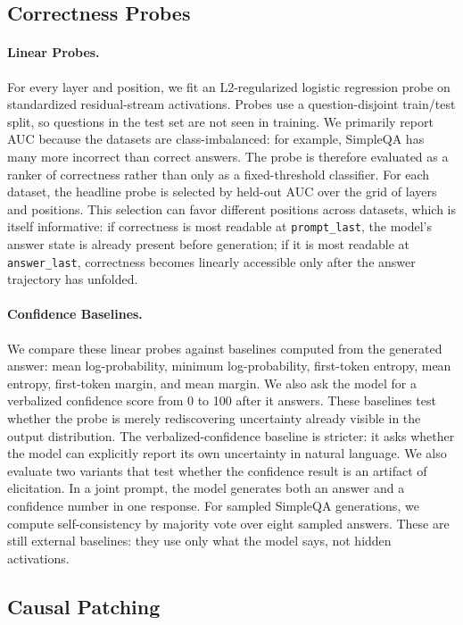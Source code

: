 \documentclass{article}
\begin{document}
\subsection{Correctness Probes}

\paragraph{Linear Probes.} For every layer and position, we fit an L2-regularized logistic regression probe on standardized residual-stream activations. Probes use a question-disjoint train/test split, so questions in the test set are not seen in
training. We primarily report AUC because the datasets are class-imbalanced: for example, SimpleQA \cite{wei2024measuring} has many more incorrect than correct answers. The probe is therefore evaluated as a ranker of correctness rather than only as a fixed-threshold
classifier. For each dataset, the headline probe is selected by held-out AUC over the grid of layers and positions. This selection can favor different positions across datasets, which is itself informative: if correctness is most readable at \texttt{prompt\_last}, the model's answer state is already present before generation; if it is most readable at \texttt{answer\_last}, correctness becomes linearly accessible only after the answer trajectory has unfolded.

\paragraph{Confidence Baselines.} We compare these linear probes against baselines computed from the generated answer: mean log-probability, minimum log-probability, first-token entropy, mean entropy, first-token margin, and mean margin. We also ask the model for a verbalized confidence score from 0 to 100 after it answers. These baselines test whether the
probe is merely rediscovering uncertainty already visible in the output
distribution. The verbalized-confidence baseline is stricter: it asks whether the model can explicitly report its own uncertainty in natural language. We also evaluate two variants that test whether the confidence result is an artifact of elicitation. In a joint prompt, the model generates both an answer and a confidence number in one response. For sampled SimpleQA generations, we compute self-consistency by majority vote over eight sampled answers. These are still external baselines: they use only what the model says, not hidden activations.

\subsection{Causal Patching}
\end{document}
